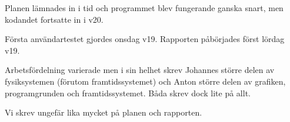 Planen lämnades in i tid och programmet blev fungerande ganska snart,
men kodandet fortsatte in i v20.

Första användartestet gjordes onsdag v19.
Rapporten påbörjades först lördag v19.


Arbetsfördelning varierade men i sin helhet skrev Johannes större
delen av fysiksystemen (förutom framtidssystemet) och
Anton större delen av grafiken, programgrunden och framtidssystemet.
Båda skrev dock lite på allt.

Vi skrev ungefär lika mycket på planen och rapporten.

